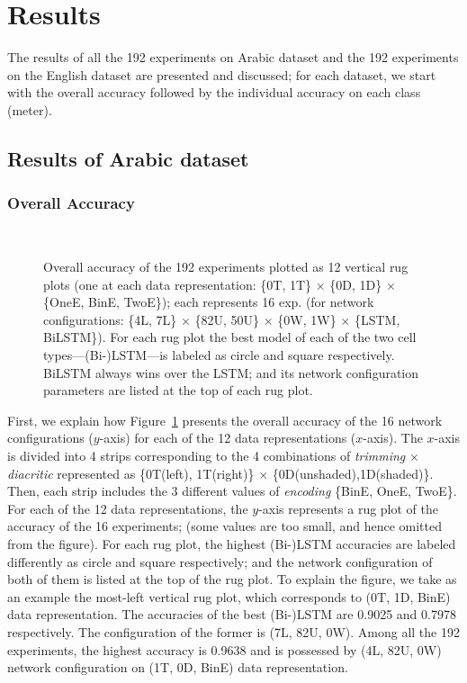 \section{Results}\label{sec:results}
The results of all the 192 experiments on Arabic dataset and the 192 experiments on the English
dataset are presented and discussed; for each dataset, we start with the overall accuracy
followed by the individual accuracy on each class (meter).


\subsection{Results of Arabic dataset}\label{sec:arabic-results}
\subsubsection{Overall Accuracy}\label{sec:encoding-effect}
\begin{figure}[!tb]
  \centering
  
  \caption{Overall accuracy of the 192 experiments plotted as 12 vertical rug plots (one at each
    data representation: \{0T, 1T\} $\times$ \{0D, 1D\} $\times$ \{OneE, BinE, TwoE\}); each
    represents 16 exp. (for network configurations: \{4L, 7L\} $\times$ \{82U, 50U\} $\times$ \{0W,
    1W\} $\times$ \{LSTM, BiLSTM\}). For each rug plot the best model of each of the two cell
    types---(Bi-)LSTM---is labeled as circle and square respectively. BiLSTM always wins over the
    LSTM; and its network configuration parameters are listed at the top of each rug
    plot.}~\label{fig:ArabicModelsResults}
\end{figure}
First, we explain how Figure~\ref{fig:ArabicModelsResults} presents the overall accuracy of the
16 network configurations ($y$-axis) for each of the 12 data representations ($x$-axis). The
$x$-axis is divided into 4 strips corresponding to the 4 combinations of \textit{trimming} $\times$
\textit{diacritic} represented as \{0T(left), 1T(right)\} $\times$
\{0D(unshaded),1D(shaded)\}. Then, each strip includes the 3 different values of \textit{encoding}
\{BinE, OneE, TwoE\}. For each of the 12 data representations, the
$y$-axis represents a rug plot of the
accuracy of the 16 experiments; (some values are too small, and hence omitted from the
figure)\@. For each rug plot, the highest (Bi-)LSTM accuracies are labeled differently as circle and
square respectively; and the network configuration of both of them is listed at the top of the rug
plot. To explain the figure, we take as an example the most-left vertical rug plot, which
corresponds to (0T, 1D, BinE) data representation. The accuracies of the best (Bi-)LSTM are 0.9025 and
0.7978 respectively. The configuration of the former is (7L, 82U, 0W). Among all the 192
experiments, the highest
accuracy is 0.9638 and is possessed by (4L, 82U, 0W) network configuration on (1T, 0D, BinE) data
representation.

